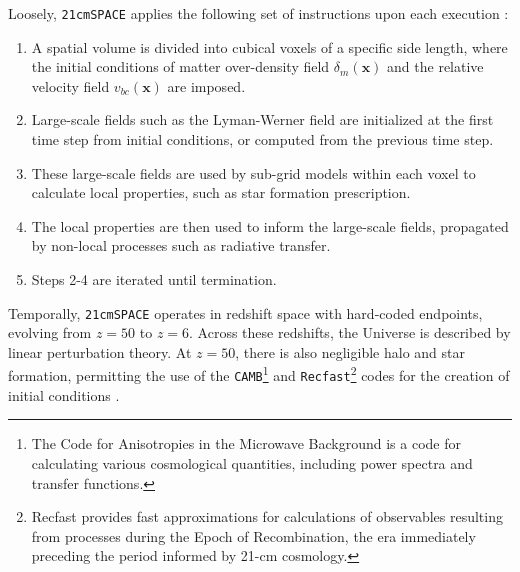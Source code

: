\documentclass[floats,floatfix,showpacs,amssymb,prd,superscriptaddress,nofootinbib, 11pt]{revtex4-2} %
\newcommand{\code}{\texttt}
\begin{document}
Loosely, \code{21cmSPACE} applies the following set of instructions upon each execution \citep{gessey-jones_thesis}:

\begin{enumerate}
    \item A spatial volume is divided into cubical voxels of a specific side length, where the initial conditions of matter over-density field $\delta_m(\textbf{x})$ and the relative velocity field $v_{bc}(\textbf{x})$ are imposed.

    \item Large-scale fields such as the Lyman-Werner field are initialized at the first time step from initial conditions, or computed from the previous time step.

    \item These large-scale fields are used by sub-grid models within each voxel to calculate local properties, such as star formation prescription.

    \item The local properties are then used to inform the large-scale fields, propagated by non-local processes such as radiative transfer.

    \item Steps 2-4 are iterated until termination.
\end{enumerate}

Temporally, \code{21cmSPACE} operates in redshift space with hard-coded endpoints, evolving from $z = 50$ to $z = 6$. Across these redshifts, the Universe is described by linear perturbation theory. At $z = 50$, there is also negligible halo and star formation, permitting the use of the \code{CAMB}\footnote{The Code for Anisotropies in the Microwave Background is a code for calculating various cosmological quantities, including power spectra and transfer functions.}\citep{Lewis_Challinor_2011} and \code{Recfast}\footnote{Recfast provides fast approximations for calculations of observables resulting from processes during the Epoch of Recombination, the era immediately preceding the period informed by 21-cm cosmology.}\citep{Seager_2011} codes for the creation of initial conditions \citep{gessey-jones_thesis}.
\end{document}
